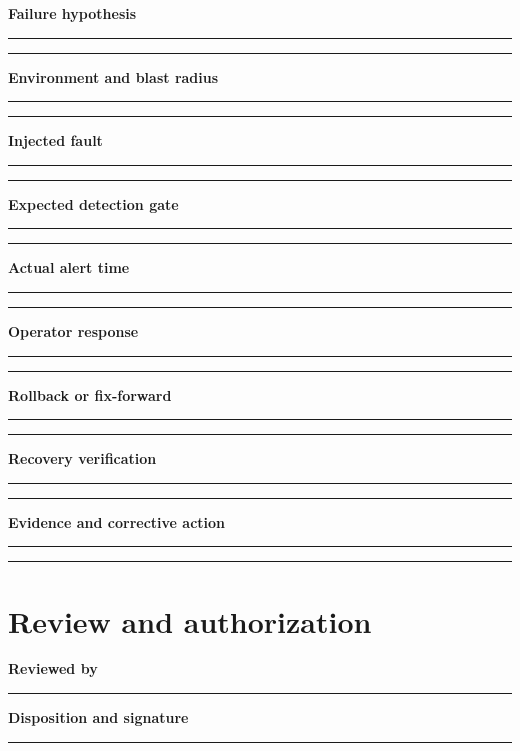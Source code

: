 \documentclass[10pt,letterpaper]{article}
\begin{document}
\textbf{Failure hypothesis}\par
\noindent\rule{\linewidth}{0.35pt}\par\vspace{0.7em}
\noindent\rule{\linewidth}{0.35pt}\par\vspace{0.7em}
\textbf{Environment and blast radius}\par
\noindent\rule{\linewidth}{0.35pt}\par\vspace{0.7em}
\noindent\rule{\linewidth}{0.35pt}\par\vspace{0.7em}
\textbf{Injected fault}\par
\noindent\rule{\linewidth}{0.35pt}\par\vspace{0.7em}
\noindent\rule{\linewidth}{0.35pt}\par\vspace{0.7em}
\textbf{Expected detection gate}\par
\noindent\rule{\linewidth}{0.35pt}\par\vspace{0.7em}
\noindent\rule{\linewidth}{0.35pt}\par\vspace{0.7em}
\textbf{Actual alert time}\par
\noindent\rule{\linewidth}{0.35pt}\par\vspace{0.7em}
\noindent\rule{\linewidth}{0.35pt}\par\vspace{0.7em}
\textbf{Operator response}\par
\noindent\rule{\linewidth}{0.35pt}\par\vspace{0.7em}
\noindent\rule{\linewidth}{0.35pt}\par\vspace{0.7em}
\textbf{Rollback or fix-forward}\par
\noindent\rule{\linewidth}{0.35pt}\par\vspace{0.7em}
\noindent\rule{\linewidth}{0.35pt}\par\vspace{0.7em}
\textbf{Recovery verification}\par
\noindent\rule{\linewidth}{0.35pt}\par\vspace{0.7em}
\noindent\rule{\linewidth}{0.35pt}\par\vspace{0.7em}
\textbf{Evidence and corrective action}\par
\noindent\rule{\linewidth}{0.35pt}\par\vspace{0.7em}
\noindent\rule{\linewidth}{0.35pt}\par\vspace{0.7em}
\section{Review and authorization}
\textbf{Reviewed by}\par
\noindent\rule{\linewidth}{0.35pt}\par\vspace{0.7em}
\textbf{Disposition and signature}\par
\noindent\rule{\linewidth}{0.35pt}\par\vspace{0.7em}
\end{document}

